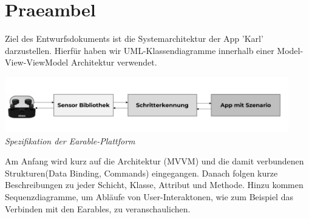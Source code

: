 \documentclass[../entwurf.tex]{subfiles}
\begin{document}
\maketitle
\tableofcontents

\clearpage
\section{Praeambel}
Ziel des Entwurfsdokuments ist die Systemarchitektur der App 'Karl' darzustellen. Hierfür haben wir UML-Klassendiagramme innerhalb einer Model-View-ViewModel Architektur verwendet.

	\begin{center}
		\includegraphics[page=1,width=350pt,keepaspectratio]{../graphics/Praeambel/YHB_Project_Pic.png}
		\textit{Spezifikation der Earable-Plattform }
	\end{center}

Am Anfang wird kurz auf die Architektur (MVVM) und die damit verbundenen Strukturen(Data Binding, Commands) eingegangen. Danach folgen kurze Beschreibungen zu jeder Schicht, Klasse, Attribut und Methode. Hinzu kommen Sequenzdiagramme, um Abläufe von User-Interaktonen, wie zum Beispiel das Verbinden mit den Earables, zu veranschaulichen.
\end{document}
